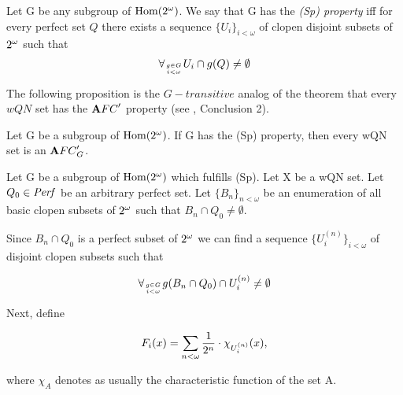 

\begin{definition}
Let G be any subgroup of ${\rm Hom(2^{\omega})}$. We say that G has the
{\it (Sp) property}\/
iff for every perfect set $Q$
there exists a sequence $\{ U_i \} _{i < \omega} $
of clopen disjoint subsets of $2^{\omega}$ such that
\[ \forall_{g \in G \atop i < \omega}
   U_i \cap g(Q) \not = \emptyset \]
\end{definition}

\bigskip

The following proposition is the $G - transitive$ analog
of the theorem that every $wQN$ set has the ${\mathbf AFC}^\prime$
property (see \cite{N}, Conclusion 2).

\begin{theorem}
Let G be a subgroup of ${\rm Hom(2^{\omega})}$. If G has the (Sp)
property, then every wQN set is an ${\mathbf AFC}^\prime_{G}$.
\end{theorem}

\proof

  Let G be a subgroup of ${\rm Hom(2^{\omega})}$ which fulfills (Sp).
Let X be a wQN set. Let $Q_0 \in {\it Perf}$
be an arbitrary perfect set.
  Let $\{ B_n \}_{n<\omega}$ be an enumeration of all
basic clopen subsets of $2^{\omega}$ such that
$B_n \cap Q_0 \not = \emptyset$.

Since $B_n \cap Q_0$ is a perfect subset of $2^{\omega}$ we can find
a sequence
$\lbrace U^{(n)}_i \rbrace _{i< \omega}$
of disjoint clopen subsets such that

\[
\forall_{g \in G \atop i < \omega}
g(B_n \cap Q_0) \cap U_i^{(n)} \not = \emptyset
\]

Next, define

\[
F_i(x) = \sum_{n < \omega} {1 \over 2^n} \cdot \chi_{U^{(n)}_i} (x),
\]

where $\chi_A$ denotes as usually the characteristic function of the set A.

